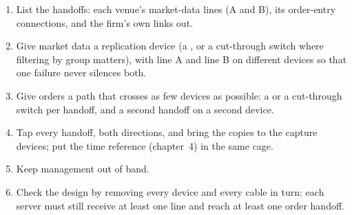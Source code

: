 \begin{method}\label{met:nw:switches-and-layer-1-devices:design}
\begin{enumerate}
\item List the handoffs: each venue's market-data lines (A and B), its order-entry connections, and the firm's own links out.
\item Give market data a replication device (a , or a cut-through switch where filtering by group matters), with
  line A and line B on different devices so that one failure never silences both.
\item Give orders a path that crosses as few devices as possible: a  or a cut-through switch per handoff, and a
  second handoff on a second device.
\item Tap every handoff, both directions, and bring the copies to the capture devices; put the time reference
  (chapter~4) in the same cage.
\item Keep management out of band.
\item Check the design by removing every device and every cable in turn: each server must still receive at least one line and
  reach at least one order handoff.
\end{enumerate}
\end{method}

